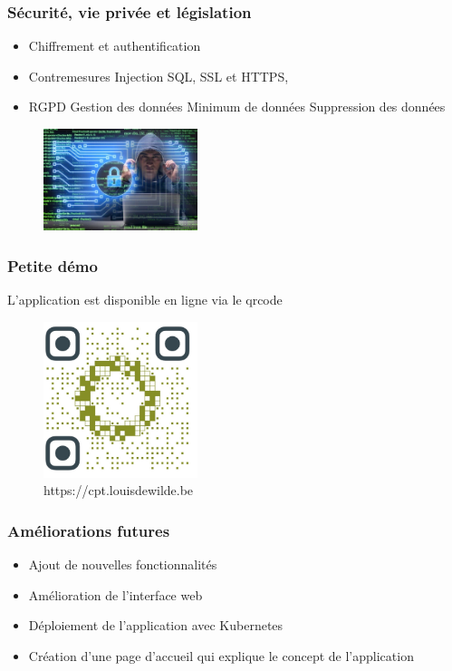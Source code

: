 \documentclass[aspectratio=169]{beamer}
\begin{document}
    \begin{frame}
        \frametitle{Sécurité, vie privée et législation}
        \begin{itemize}
            \item Chiffrement et authentification
            \item Contremesures
            \subitem Injection SQL,
            \subitem SSL et HTTPS,
            \item RGPD
            \subitem Gestion des données
            \subitem Minimum de données
            \subitem Suppression des données
        \end{itemize}
        \begin{figure}[h]
            \centering
            \includegraphics[width=0.4\textwidth]{imgs/young-hacker-cyber-securty-concept-260nw-1450697288}\label{fig:figure5}
        \end{figure}

    \end{frame}

    \begin{frame}
        \frametitle{Petite démo}
        L'application est disponible en ligne via le qrcode
        \begin{figure}[h]
            \centering
            \includegraphics[width=0.4\textwidth]{imgs/QRcode_C2 (5)}\caption{https://cpt.louisdewilde.be}\label{fig:figure2}
        \end{figure}
    \end{frame}

    \begin{frame}
        \frametitle{Améliorations futures}
        \begin{itemize}
            \item Ajout de nouvelles fonctionnalités
            \item Amélioration de l'interface web
            \item Déploiement de l'application avec Kubernetes
            \item Création d'une page d'accueil qui explique le concept de l'application
        \end{itemize}
    \end{frame}
\end{document}

